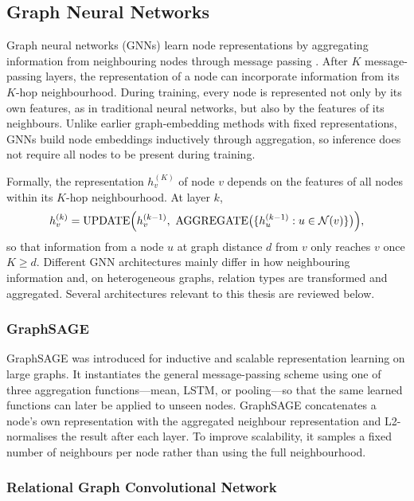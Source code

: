 \subsection{Graph Neural Networks}
\label{subsec:related-gnn}

Graph neural networks (GNNs) learn node representations by aggregating
information from neighbouring nodes through message passing
\cite{hamilton2017inductive}.
After $K$ message-passing layers, the representation of a node can
incorporate information from its $K$-hop neighbourhood.
During training, every node is represented not only by its own features, as
in traditional neural networks, but also by the features of its neighbours.
Unlike earlier graph-embedding methods with fixed representations, GNNs
build node embeddings inductively through aggregation, so inference does not
require all nodes to be present during training.

Formally, the representation $h_v^{(K)}$ of node $v$ depends on the features
of all nodes within its $K$-hop neighbourhood.
At layer $k$,
\begin{equation}
h_v^{(k)} = \text{UPDATE}\Bigl(h_v^{(k-1)},\ \text{AGGREGATE}\bigl(\{h_u^{(k-1)} : u \in \mathcal{N}(v)\}\bigr)\Bigr),
\end{equation}
so that information from a node $u$ at graph distance $d$ from $v$ only
reaches $v$ once $K \geq d$.
Different GNN architectures mainly differ in how neighbouring information
and, on heterogeneous graphs, relation types are transformed and aggregated.
Several architectures relevant to this thesis are reviewed below.

\subsubsection{GraphSAGE}

GraphSAGE \cite{hamilton2017inductive} was introduced for inductive and
scalable representation learning on large graphs.
It instantiates the general message-passing scheme using one of three
aggregation functions---mean, LSTM, or pooling---so that the same learned
functions can later be applied to unseen nodes.
GraphSAGE concatenates a node's own representation with the aggregated
neighbour representation and L2-normalises the result after each layer.
To improve scalability, it samples a fixed number of neighbours per node
rather than using the full neighbourhood.

\subsubsection{Relational Graph Convolutional Network}

